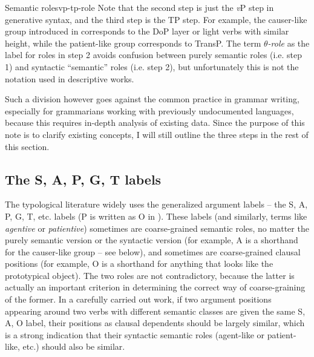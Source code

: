 \documentclass[UTF8, a4paper, oneside, scheme=plain]{ctexrep}
\newcommand*{\term}[1]{\emph{#1}}
\newcommand{\vP}{\textit{v}P}
\begin{document}
\begin{theorybox}{Semantic roles}{vp-tp-role}
    Note that the second step is just the \vP{} step in generative syntax,
    and the third step is the TP step.
    For example, the causer-like group introduced in 
    corresponds to the DoP layer or light verbs with similar height,
    while the patient-like group corresponds to TransP.
    The term \term{$\theta$-role} as the label for roles in step 2 avoids confusion 
    between purely semantic roles (i.e. step 1) and syntactic ``semantic'' roles (i.e. step 2),
    but unfortunately this is not the notation used in descriptive works.
\end{theorybox}

Such a division however goes against the common practice in grammar writing,
especially for grammarians working with previously undocumented languages,
because this requires in-depth analysis of existing data.
Since the purpose of this note is to clarify existing concepts,
I will still outline the three steps in the rest of this section.

\subsection{The S, A, P, G, T labels}

The typological literature widely uses the generalized argument labels -- the S, A, P, G, T, etc. labels
(P is written as O in \citet{dixon2009basic1}).
These labels (and similarly, terms like \term{agentive} or \term{patientive}) 
sometimes are coarse-grained semantic roles, 
no matter the purely semantic version or the syntactic version
(for example, A is a shorthand for the causer-like group -- see below),
and sometimes are coarse-grained clausal positions
(for example, O is a shorthand for anything that looks like the prototypical object).
The two roles are not contradictory, 
because the latter is actually an important criterion 
in determining the correct way of coarse-graining of the former.
In a carefully carried out work,
if two argument positions appearing around two verbs with different semantic classes 
are given the same S, A, O label,
their positions as clausal dependents should be largely similar,
which is a strong indication that their syntactic semantic roles 
(agent-like or patient-like, etc.)
should also be similar. 
\end{document}
